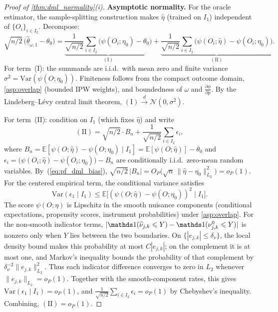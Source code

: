 \begin{proof}[Proof of \cref{thm:dml_normality}\textup{(i)}]
\medskip
\noindent\textbf{Asymptotic normality.}
For the oracle estimator, the sample-splitting construction makes $\hat{\eta}$ (trained on $I_1$) independent of $\{O_i\}_{i \in I_2}$. Decompose:
\begin{equation}\label{eq:pf_dml_decomp}
    \sqrt{n/2}\,\bigl(\hat{\underline{\theta}}_{\omega,1} - \theta_0\bigr) = \underbrace{\frac{1}{\sqrt{n/2}}\sum_{i \in I_2}\bigl(\psi(O_i;\eta_0) - \theta_0\bigr)}_{\mathrm{(I)}} + \underbrace{\frac{1}{\sqrt{n/2}}\sum_{i \in I_2}\bigl(\psi(O_i;\hat{\eta}) - \psi(O_i;\eta_0)\bigr)}_{\mathrm{(II)}}.
\end{equation}
For term~(I): the summands are i.i.d.\ with mean zero and finite variance $\sigma^2 = \mathrm{Var}(\psi(O;\eta_0))$. Finiteness follows from the compact outcome domain, \cref{asp:overlap} (bounded IPW weights), and boundedness of $\omega$ and $\frac{\partial\phi}{\partial p}$. By the Lindeberg--L\'{e}vy central limit theorem, $\mathrm{(I)} \xrightarrow{d} \mathcal{N}(0,\sigma^2)$.

For term~(II): condition on $I_1$ (which fixes $\hat{\eta}$) and write
\[
    \mathrm{(II)} = \sqrt{n/2}\cdot B_n + \frac{1}{\sqrt{n/2}}\sum_{i \in I_2}\epsilon_i,
\]
where $B_n = \mathbb{E}[\psi(O;\hat{\eta}) - \psi(O;\eta_0) \mid I_1] = \mathbb{E}[\psi(O;\hat{\eta})] - \theta_0$ and $\epsilon_i = \bigl(\psi(O_i;\hat{\eta}) - \psi(O_i;\eta_0)\bigr) - B_n$ are conditionally i.i.d.\ zero-mean random variables. By~(\ref{eq:pf_dml_bias}), $\sqrt{n/2}\,|B_n| = O_P\bigl(\sqrt{n}\,\|\hat{\eta} - \eta_0\|_{L_2}^2\bigr) = o_P(1)$. For the centered empirical term, the conditional variance satisfies
\[
    \mathrm{Var}(\epsilon_1 \mid I_1) \leqslant \mathbb{E}\bigl[(\psi(O;\hat{\eta}) - \psi(O;\eta_0))^2 \mid I_1\bigr].
\]
The score $\psi(O;\eta)$ is Lipschitz in the smooth nuisance components (conditional expectations, propensity scores, instrument probabilities) under \cref{asp:overlap}. For the non-smooth indicator terms, $|\indicator(\hat{\nu}_{j,k} \leqslant Y) - \indicator(\nu_{j,k}^0 \leqslant Y)|$ is nonzero only when $Y$ lies between the two boundaries. On $\{|e_{j,k}|\leqslant\delta_\nu\}$, the local density bound makes this probability at most $C|e_{j,k}|$; on the complement it is at most one, and Markov's inequality bounds the probability of that complement by $\delta_\nu^{-2}\|e_{j,k}\|_{L_2}^2$. Thus each indicator difference converges to zero in $L_2$ whenever $\|e_{j,k}\|_{L_2}=o_P(1)$. Together with the smooth-component rates, this gives $\mathrm{Var}(\epsilon_1 \mid I_1)=o_P(1)$, and $\frac{1}{\sqrt{n/2}}\sum_{i \in I_2}\epsilon_i=o_P(1)$ by Chebyshev's inequality. Combining, $\mathrm{(II)}=o_P(1)$.


\end{proof}
